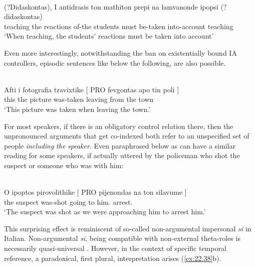 \documentclass[output=paper]{langsci/langscibook}
\begin{document}
\ea%
    \label{ex:22.35}\\
    \gll    (?Didaskontas),   I  antidrasis ton     mathiton  prepi  {na lamvanonde} ipopsi     (?didaskontas)\\
            \hphantom{(?}teaching  the  reactions of-the students  must  be-taken into-account  \hphantom{(?}teaching\\
    \glt    ‘When teaching, the students’ reactions must be taken into account’
\z

Even more interestingly, notwithstanding the ban on existentially bound IA
controllers, episodic sentences like  below the following, are
also possible.

\ea%
    \label{ex:22.36} \\
    \gll    Afti  i   fotografia travixtike [ PRO fevgontas apo    tin  poli ] \\
            this the     picture      was-taken {} {}    leaving     from  the town\\
    \glt    \enquote*{This picture was taken when leaving the town.}
\z

For most speakers, if there is an obligatory control relation there, then the
unpronounced arguments that get co-indexed both refer to an unspecified set of
people \emph{including} \emph{the} \emph{speaker}.   Even 
paraphrased below as  can have a similar reading for some
speakers, if actually uttered by the policeman who shot the suspect or someone
who was with him:

\ea%
\label{ex:22.37}\\
    \gll    \llap{\%}O    ipoptos   pirovolithike   [ PRO pijenondas   na   ton silavume ]\\
            the suspect  was-shot {} {}      going    to  him.\Cl{} arrest.\Fpl{}\\
    \glt    \enquote*{The suspect was shot as we were approaching him to arrest him.}
\z

This surprising effect is reminiscent of so-called non-argumental impersonal
\emph{si} in Italian. Non-argumental \emph{si}, being compatible with
non-external theta-roles is necessarily quasi-universal \citep{Cinque:1988}.
However, in the context of specific temporal reference, a paradoxical,
first plural, interpretation arises (\ref{ex:22.38}b).

\ea%
    \label{ex:22.38}
    \z
\z
\end{document}
